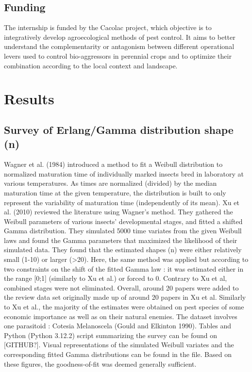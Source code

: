 \documentclass[12pt,a4paper,onecolumn]{article}
\begin{document}
\subsection{Funding}
The internship is funded by the Cacolac project, which objective is to integratively develop agroecological methods of pest control. It aims to better understand the complementarity or antagonism between different operational levers used to control bio-aggressors in perennial crops and to optimize their combination according to the local context and landscape.


\section{Results}
\subsection{Survey of Erlang/Gamma distribution shape (n)}
\tabto{1 cm} Wagner et al. (1984) introduced a method to fit a Weibull distribution to normalized maturation time of individually marked insects bred in laboratory at various temperatures. As times are normalized (divided) by the median maturation time at the given temperature, the distribution is built to only represent the variability of maturation time (independently of its mean). Xu et al. (2010) reviewed the literature using Wagner's method. They gathered the Weibull parameters of various insects' developmental stages, and fitted a shifted Gamma distribution. They simulated 5000 time variates from the given Weibull laws and found the Gamma parameters that maximized the likelihood of their simulated data. They found that the estimated shapes (n) were either relatively small (1-10) or larger (>20). Here, the same method was applied but according to two constraints on the shift of the fitted Gamma law : it was estimated either in the range [0;1] (similarly to Xu et al.) or forced to 0. Contrary to Xu et al, combined stages were not eliminated. Overall, around 20 papers were added to the review data set originally made up of around 20 papers in Xu et al. Similarly to Xu et al., the majority of the estimates were obtained on pest species of some economic importance as well as on their natural enemies. The dataset involves one parasitoid : Cotesia Melanoscela (Gould and Elkinton 1990). Tables and Python (Python 3.12.2) script summarizing the survey can be found on [GITHUB?]. Visual representations of the simulated Weibull variates and the corresponding fitted Gamma distributions can be found in the file. Based on these figures, the goodness-of-fit was deemed generally sufficient.
\end{document}
